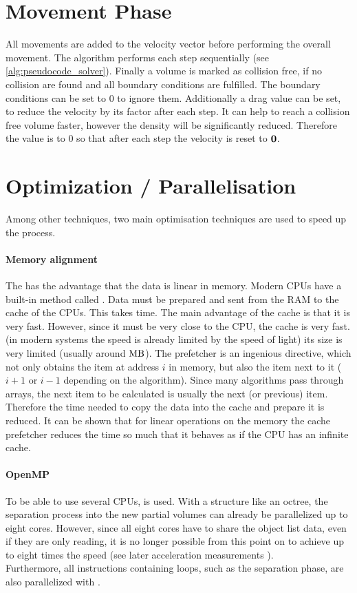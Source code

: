 \section{Movement Phase}
All movements are added to the velocity vector before performing the overall movement.
The algorithm performs each step sequentially (see \cref{alg:pseudocode_solver}).
% 
Finally a volume is marked as collision free, if no collision are found and all boundary conditions are fulfilled. 
The boundary conditions can be set to 0 to ignore them.
Additionally a drag value can be set, to reduce the velocity by its factor after each step.
It can help to reach a collision free volume faster, however the density will be significantly reduced.
Therefore the value is to 0 so that after each step the velocity is reset to $\mathbf{0}$. 
% 
\section{Optimization / Parallelisation}
% 
Among other techniques, two main optimisation techniques are used to speed up the process.
% 
\paragraph{Memory alignment}
The  has the advantage that the data is linear in memory.
Modern \acp{CPU} have a built-in method called .
Data must be prepared and sent from the \ac{RAM} to the cache of the \acp{CPU}.
This takes time.
The main advantage of the cache is that it is very fast.
However, since it must be very close to the \ac{CPU}, the cache is very fast. (in modern systems the speed is already limited by the speed of light) its size is very limited (usually around $\si{\mega\byte}$).
The prefetcher is an ingenious directive, which not only obtains the item at address $i$ in memory, but also the item next to it ($i+1$ or $i-1$ depending on the algorithm).
Since many algorithms pass through arrays, the next item to be calculated is usually the next (or previous) item.
Therefore the time needed to copy the data into the cache and prepare it is reduced.
It can be shown that for linear operations on the memory the cache prefetcher reduces the time so much that it behaves as if the \ac{CPU} has an infinite cache.
% 
\paragraph{OpenMP}
% 
To be able to use several \acp{CPU}, \openmp is used. With a structure like an octree, the separation process into the new partial volumes can already be parallelized up to eight cores.
However, since all eight cores have to share the object list data, even if they are only reading, it is no longer possible from this point on to achieve up to eight times the speed (see later acceleration measurements \dummy{}).
\\
% 
Furthermore, all instructions containing loops, such as the separation phase, are also parallelized with \openmp.
% 
% 
% 
